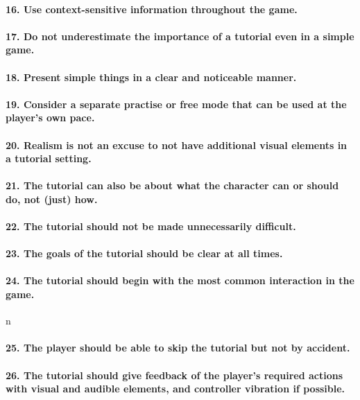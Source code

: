 \paragraph{16. Use context-sensitive information throughout the game. }
\paragraph{17. Do not underestimate the importance of a tutorial even in a simple game.}
\paragraph{18. Present simple things in a clear and noticeable manner.}
\paragraph{19. Consider a separate practise or free mode that can be used at the player's own pace.}
\paragraph{20. Realism is not an excuse to not have additional visual elements in a tutorial setting.}
\paragraph{21. The tutorial can also be about what the character can or should do, not (just) how.}
\paragraph{22. The tutorial should not be made unnecessarily difficult.}
\paragraph{23. The goals of the tutorial should be clear at all times.}
\paragraph{24. The tutorial should begin with the most common interaction in the game.}
n\paragraph{25. The player should be able to skip the tutorial but not by accident.}
\paragraph{26. The tutorial should give feedback of the player's required actions with visual and audible elements, and controller vibration if possible.}
